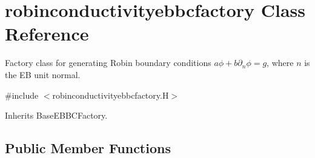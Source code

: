 \hypertarget{classrobinconductivityebbcfactory}{}\section{robinconductivityebbcfactory Class Reference}
\label{classrobinconductivityebbcfactory}


Factory class for generating Robin boundary conditions $a\phi + b\partial_n\phi = g$, where $n$ is the EB unit normal.  




{\ttfamily \#include $<$robinconductivityebbcfactory.\+H$>$}



Inherits Base\+E\+B\+B\+C\+Factory.

\subsection*{Public Member Functions}
